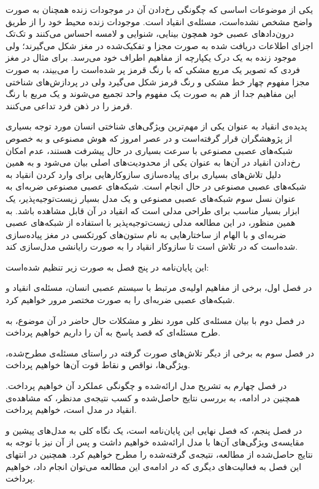 \documentclass[12pt]{report}
\begin{document}
	یکی از موضوعات اساسی که چگونگی رخ‌دادن آن در موجودات زنده همچنان به صورت واضح مشخص نشده‌است، مسئله‌ی انقیاد است. موجودات زنده محیط خود را از طریق درون‌داد‌های عصبی خود همچون بینایی، شنوایی و لامسه احساس می‌کنند و تک‌تک اجزای اطلاعات دریافت شده به صورت مجزا و تفکیک‌شده در مغز شکل می‌گیرند؛ ولی  موجود زنده به یک درک یکپارچه از مفاهیم اطراف خود می‌رسد. برای مثال در مغز فردی که تصویر یک مربع مشکی که با رنگ قرمز پر شده‌‌است را می‌بیند، به صورت مجزا مفهوم چهار خط مشکی و رنگ قرمز شکل می‌گیرد ولی در پردازش‌های شناختی  این مفاهیم جدا از هم به صورت یک مفهوم واحد تجمیع می‌شوند و یک مربع با رنگ قرمز را در ذهن فرد تداعی می‌کنند.
	
	پدیده‌ی انقیاد به عنوان یکی از مهم‌ترین ویژگی‌های شناختی انسان مورد توجه بسیاری از پژوهشگران قرار گرفته‌است و در عصر امروز که هوش مصنوعی و به خصوص شبکه‌های عصبی مصنوعی با سرعت بسیاری در حال پیشرفت هستند، عدم امکان رخ‌دادن انقیاد در آن‌ها به عنوان یکی از محدودیت‌های اصلی بیان می‌شود و به همین دلیل تلاش‌های بسیاری برای پیاده‌سازی سازوکار‌هایی برای وارد کردن انقیاد به شبکه‌های عصبی مصنوعی در حال انجام است. شبکه‌های عصبی مصنوعی ضربه‌ای به عنوان نسل سوم شبکه‌های عصبی مصنوعی و یک مدل بسیار زیست‌توجیه‌پذیر، یک ابزار بسیار مناسب برای طراحی مدلی است که انقیاد در آن قابل مشاهده باشد. به همین منظور، در این مطالعه مدلی زیست‌توجیه‌پذیر با استفاده از شبکه‌های عصبی ضربه‌ای و با الهام از ساختار‌هایی به نام ستون‌های کورتکسی در مغز پیاده‌سازی شده‌است که در تلاش است تا سازوکار انقیاد را به صورت رایانشی مدل‌سازی کند.
	
	این پایان‌نامه در پنج فصل به صورت زیر تنظیم شده‌است:
	
در فصل اول، برخی از مفاهیم اولیه‌ی مرتبط با سیستم عصبی انسان، مسئله‌ی انقیاد و شبکه‌های عصبی ضربه‌ای را به صورت مختصر مرور خواهیم کرد.

در فصل دوم با بیان مسئله‌ی کلی مورد نظر و مشکلات حال حاضر در آن موضوع، به طرح مسئله‌ای که قصد پاسخ به آن را داریم خواهیم پرداخت.

در فصل سوم به برخی از دیگر تلاش‌های صورت گرفته در راستای مسئله‌ی مطرح‌شده، ویژگی‌ها، نواقص و نقاط قوت آن‌ها خواهیم پرداخت.

در فصل چهارم به تشریح مدل ارائه‌شده و چگونگی عملکرد آن خواهیم پرداخت. همچنین در ادامه، به بررسی نتایج حاصل‌شده و کسب نتیجه‌ی مدنظر، که مشاهده‌ی انقیاد در مدل است، خواهیم پرداخت.

در فصل پنجم، که فصل نهایی این پایان‌نامه است، یک نگاه کلی به مدل‌های پیشین و مقایسه‌ی ویژگی‌های آن‌ها با مدل ارائه‌شده خواهیم داشت و پس از آن نیز با توجه به نتایج حاصل‌شده از مطالعه، نتیجه‌ی گرفته‌شده را مطرح خواهیم کرد. همچنین در انتهای این فصل به فعالیت‌های دیگری که در ادامه‌ی این مطالعه می‌توان انجام داد، خواهیم پرداخت. 
	
\end{document}
